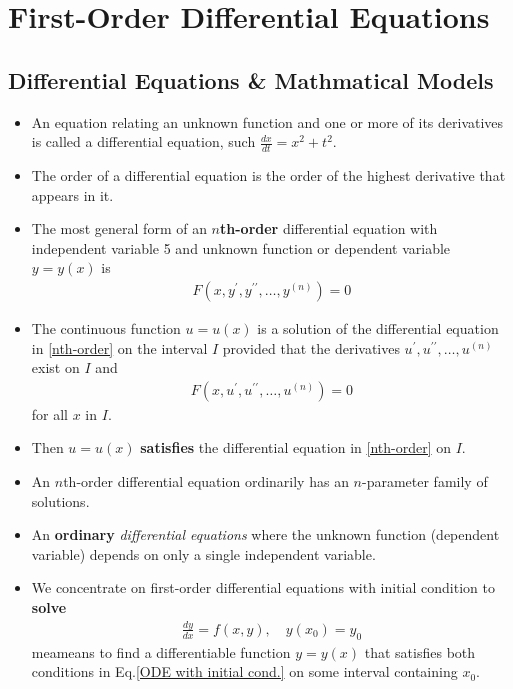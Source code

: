 \chapter{First-Order Differential Equations}
    \section{Differential Equations \& Mathmatical Models}
        \begin{itemize}
            \item An equation relating an unknown function and one or more of its derivatives 
            is called a differential equation, such $\frac{dx}{dt}=x^2+t^2$.
            \item The order of a differential equation is the order of the highest derivative that appears in it.
            \item The most general form of an \textbf{$n$th-order} differential equation with 
            independent variable 5 and unknown function or dependent variable $y=y(x)$ is
            \begin{align} \label{nth-order}
                F(x, y^{\prime}, y^{\prime \prime}, \dots, y^{(n)})=0
            \end{align}
            \item The continuous function $u=u(x)$ is a solution of the differential equation in \eqref{nth-order} 
            on the interval $I$ provided that the derivatives $u^\prime, u^{\prime \prime}, \dots, u^{(n)}$ 
            exist on $I$ and 
            \begin{align}
                F(x, u^{\prime}, u^{\prime \prime}, \dots, u^{(n)})=0
            \end{align}
            for all $x$ in $I$.
            \item Then $u=u(x)$ \textbf{satisfies} the differential equation in \eqref{nth-order} on $I$.
            \item An $n$th-order differential equation ordinarily has an $n$-parameter family of solutions.
            \item  An \textbf{ordinary} \textit{differential equations} where the unknown function 
                (dependent variable) depends on only a single independent variable.
            \item We concentrate on first-order differential equations with initial condition to \textbf{solve}
                \begin{align} \label{ODE with initial cond.}
                    \frac{dy}{dx} = f(x, y), \quad y(x_0)=y_0
                \end{align}
                meameans to find a differentiable function $y=y(x)$ that satisfies both conditions in Eq.\eqref{ODE with initial cond.} 
                on some interval containing $x_0$.
        \end{itemize}

